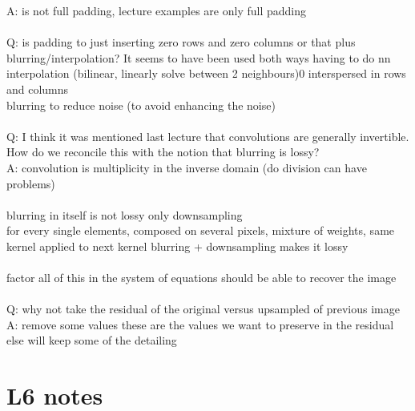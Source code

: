 \documentclass[11pt]{article}
\begin{document}
A: is not full padding, lecture examples are only full padding
\\\\
\noindent
Q: is padding to just inserting zero rows and zero columns or that plus blurring/interpolation? It seems to have been used both ways having to do nn interpolation (bilinear, linearly solve between 2 neighbours)0 interspersed in rows and columns
\\
blurring to reduce noise (to avoid enhancing the noise)
\\\\
Q: I think it was mentioned last lecture that convolutions are generally invertible. How do we reconcile this with the notion that blurring is lossy?\\
A: convolution is multiplicity in the inverse domain (do division can have problems)\\\\
blurring in itself is not lossy
only downsampling
\\
for every single elements, composed on several pixels, mixture of weights, same kernel applied to next kernel
blurring + downsampling makes it lossy
\\\\
factor all of this in the system of equations should be able to recover the image
\\\\
Q: why not take the residual of the original versus upsampled of previous image\\
A: remove some values these are the values we want to preserve in the residual
else will keep some of the detailing 
\\
\section*{L6 notes}
\end{document}
